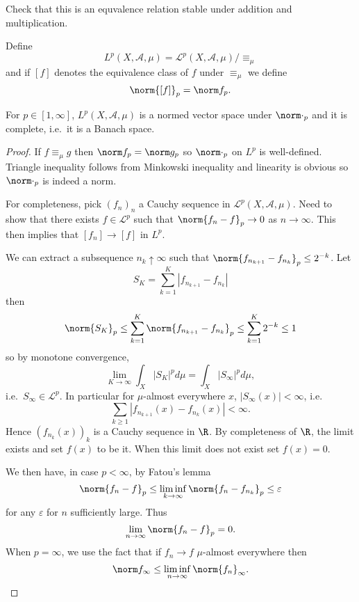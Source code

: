 \documentclass[a4paper]{article}
\begin{document}
Check that this is an equvalence relation stable under addition and multiplication.

\begin{definition}[\(L^p\)-space]
  Define
  \[
    L^p(X, \mathcal A, \mu) = \mathcal L^p(X, \mathcal A, \mu) / \equiv_\mu
  \]
  and if \([f]\) denotes the equivalence class of \(f\) under \(\equiv_\mu\) we define
  \[
    \norm{[f]}_p = \norm f_p.
  \]
\end{definition}

\begin{proposition}
  For \(p \in [1, \infty]\), \(L^p(X, \mathcal A, \mu)\) is a normed vector space under \(\norm \cdot_p\) and it is complete, i.e.\ it is a Banach space.
\end{proposition}

\begin{proof}
  If \(f \equiv_\mu g\) then \(\norm f_p = \norm g_p\) so \(\norm \cdot_p\) on \(L^p\) is well-defined. Triangle inequality follows from Minkowski inequality and linearity is obvious so \(\norm \cdot_p\) is indeed a norm.

  For completeness, pick \((f_n)_n\) a Cauchy sequence in \(\mathcal L^p(X, \mathcal A, \mu)\). Need to show that there exists \(f \in \mathcal L^p\) such that \(\norm{f_n - f}_p \to 0\) as \(n \to \infty\). This then implies that \([f_n] \to [f]\) in \(L^p\).

  We can extract a subsequence \(n_k \uparrow \infty\) such that \(\norm{f_{n_{k + 1}} - f_{n_k}}_p \leq 2^{-k}\). Let
  \[
    S_K = \sum_{k = 1}^K |f_{n_{k + 1}} - f_{n_k}|
  \]
  then
  \[
    \norm{S_K}_p
    \leq \sum_{k = 1}^K \norm{f_{n_{k + 1}} - f_{n_k}}_p
    \leq \sum_{k = 1}^K 2^{-k}
    \leq 1
  \]
  so by monotone convergence,
  \[
    \lim_{K \to \infty} \int_X |S_K|^p d\mu = \int_X |S_\infty|^p d\mu,
  \]
  i.e.\ \(S_\infty \in \mathcal L^p\). In particular for \(\mu\)-almost everywhere \(x\), \(|S_\infty(x)| < \infty\), i.e.
  \[
    \sum_{k \geq 1} |f_{n_{k + 1}}(x) - f_{n_k}(x)| < \infty.
  \]
  Hence \((f_{n_k}(x))_k\) is a Cauchy sequence in \(\R\). By completeness of \(\R\), the limit exists and set \(f(x)\) to be it. When this limit does not exist set \(f(x) = 0\).

  We then have, in case \(p < \infty\), by Fatou's lemma
  \[
    \norm{f_n - f}_p \leq \liminf_{k \to \infty} \norm{f_n - f_{n_k}}_p \leq \varepsilon
  \]
  for any \(\varepsilon\) for \(n\) sufficiently large. Thus
  \[
    \lim_{n \to \infty} \norm{f_n - f}_p = 0.
  \]
  When \(p = \infty\), we use the fact that if \(f_n \to f\) \(\mu\)-almost everywhere then
  \[
    \norm f_\infty \leq \liminf_{n \to \infty} \norm{f_n}_\infty.
  \]


\end{proof}
\end{document}
